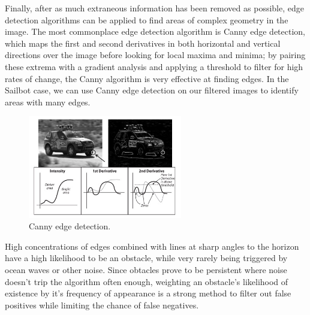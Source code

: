 Finally, after as much extraneous information has been removed as possible, edge detection algorithms can be applied to find areas of complex geometry in the image. The most commonplace edge detection algorithm is Canny edge detection, which maps the first and second derivatives in both horizontal and vertical directions over the image before looking for local maxima and minima; by pairing these extrema with a gradient analysis and applying a threshold to filter for high rates of change, the Canny algorithm is very effective at finding edges. In the Sailbot case, we can use Canny edge detection on our filtered images to identify areas with many edges. 
\begin{figure}
\centering
\includegraphics[width=0.6\textwidth]{"./image/canny"}
\caption{Canny edge detection.}
\label{fig:canny}
\end{figure}

High concentrations of edges combined with lines at sharp angles to the horizon have a high likelihood to be an obstacle, while very rarely being triggered by ocean waves or other noise. Since obtacles prove to be persistent where noise doesn't trip the algorithm often enough, weighting an obstacle's likelihood of existence by it's frequency of appearance is a strong method to filter out false positives while limiting the chance of false negatives.

